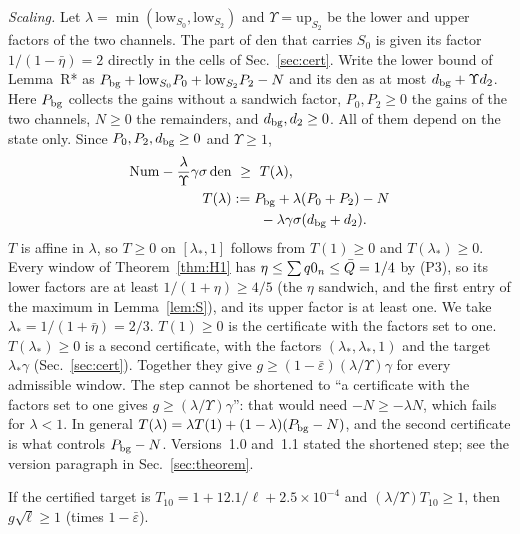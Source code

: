 \emph{Scaling.}
Let $\lambda=\min(\mathrm{low}_{S_0},\mathrm{low}_{S_2})$ and $\Upsilon=\mathrm{up}_{S_2}$ be the lower and upper factors of the two channels.
The part of $\mathrm{den}$ that carries $S_0$ is given its factor $1/(1-\bar\eta)=2$ directly in the cells of Sec.~\ref{sec:cert}.
Write the lower bound of Lemma~R* as $P_{\rm bg}+\mathrm{low}_{S_0}P_0+\mathrm{low}_{S_2}P_2-N$ and its den as at most $d_{\rm bg}+\Upsilon d_2$.
Here $P_{\rm bg}$ collects the gains without a sandwich factor, $P_0,P_2\ge0$ the gains of the two channels, $N\ge0$ the remainders, and $d_{\rm bg},d_2\ge0$.
All of them depend on the state only.
Since $P_0,P_2,d_{\rm bg}\ge0$ and $\Upsilon\ge1$,
\begin{equation}
\begin{split}
\mathrm{Num}-\frac{\lambda}{\Upsilon}\gamma\sigma\,\mathrm{den}&\ \ge\ T(\lambda),\\
T(\lambda)&:=P_{\rm bg}+\lambda(P_0+P_2)-N\\
&\qquad-\lambda\gamma\sigma(d_{\rm bg}+d_2).
\end{split}
\end{equation}
$T$ is affine in $\lambda$, so $T\ge0$ on $[\lambda_*,1]$ follows from $T(1)\ge0$ and $T(\lambda_*)\ge0$.
Every window of Theorem~\ref{thm:H1} has $\eta\le\sum q0_n\le\bar Q=1/4$ by (P3), so its lower factors are at least $1/(1+\eta)\ge4/5$ (the $\eta$ sandwich, and the first entry of the maximum in Lemma~\ref{lem:S}), and its upper factor is at least one.
We take $\lambda_*=1/(1+\bar\eta)=2/3$.
$T(1)\ge0$ is the certificate with the factors set to one.
$T(\lambda_*)\ge0$ is a second certificate, with the factors $(\lambda_*,\lambda_*,1)$ and the target $\lambda_*\gamma$ (Sec.~\ref{sec:cert}).
Together they give $g\ge(1-\bar\varepsilon)(\lambda/\Upsilon)\gamma$ for every admissible window.
The step cannot be shortened to ``a certificate with the factors set to one gives $g\ge(\lambda/\Upsilon)\gamma$'': that would need $-N\ge-\lambda N$, which fails for $\lambda<1$.
In general $T(\lambda)=\lambda T(1)+(1-\lambda)(P_{\rm bg}-N)$, and the second certificate is what controls $P_{\rm bg}-N$.
Versions~1.0 and~1.1 stated the shortened step; see the version paragraph in Sec.~\ref{sec:theorem}.

\begin{corollary}[Corollary S] \proofst
\label{cor:S}
If the certified target is $T_{10}=1+12.1/\ell+2.5\times10^{-4}$ and $(\lambda/\Upsilon)T_{10}\ge1$, then $g\sqrt\ell\ge1$ (times $1-\bar\varepsilon$).
\end{corollary}

